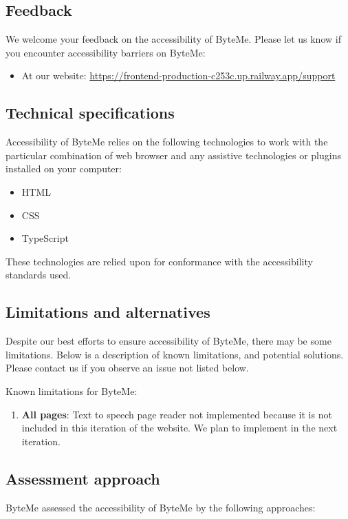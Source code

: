 \documentclass[11pt, a4paper]{report}
\begin{document}
\subsection*{Feedback}
We welcome your feedback on the accessibility of ByteMe. Please let us know if you encounter accessibility barriers on ByteMe:

\begin{itemize}
	\item At our website: \url{https://frontend-production-c253c.up.railway.app/support}
\end{itemize}

\subsection*{Technical specifications}
Accessibility of ByteMe relies on the following technologies to work with the particular combination of web browser and any assistive technologies or plugins installed on your computer:

\begin{itemize}
	\item HTML
	\item CSS
	\item TypeScript
\end{itemize}

These technologies are relied upon for conformance with the accessibility standards used.

\subsection*{Limitations and alternatives}
Despite our best efforts to ensure accessibility of ByteMe, there may be some limitations. Below is a description of known limitations, and potential solutions. Please contact us if you observe an issue not listed below.

Known limitations for ByteMe:

\begin{enumerate}
	\item \textbf{All pages}: Text to speech page reader not implemented because it is not included in this iteration of the website. We plan to implement in the next iteration.
\end{enumerate}

\subsection*{Assessment approach}
ByteMe assessed the accessibility of ByteMe by the following approaches:
\end{document}
